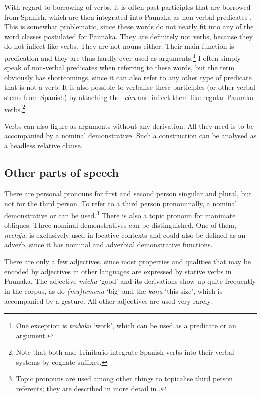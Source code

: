 With regard to borrowing of verbs, it is often past participles that are borrowed from Spanish, which are then integrated into Paunaka as non-verbal predicates \citep[cf.][]{Terhart_subm}. This is somewhat problematic, since these words do not neatly fit into any of the word classes postulated for Paunaka. They are definitely not verbs, because they do not inflect like verbs. They are not nouns either. Their main function is predication and they are thus hardly ever used as arguments.\footnote{One exception is \textit{trabaku} ‘work’, which can be used as a predicate or an argument.} I often simply speak of non-verbal predicates when referring to these words, but the term obviously has shortcomings, since it can also refer to any other type of predicate that is not a verb. It is also possible to verbalise these participles (or other verbal stems from Spanish) by attaching the  \textit{-chu} and inflect them like regular Paunaka verbs.\footnote{Note that both  and Trinitario integrate Spanish verbs into their verbal systems by cognate suffixes.}

Verbs can also figure as arguments without any derivation. All they need is to be accompanied by a nominal demonstrative. Such a construction can be analysed as a headless relative clause.

\subsection{Other parts of speech}\label{sec:POS_Others}

There are personal pronouns for first and second person singular and plural, but not for the third person. To refer to a third person pronominally, a nominal demonstrative or  can be used.\footnote{Topic pronouns are used among other things to topicalise third person referents; they are described in more detail in .} There is also a topic pronoun for inanimate obliques. Three nominal demonstratives can be distinguished. One of them, \textit{nechÿu}, is exclusively used in locative contexts and could also be defined as an adverb, since it has nominal and adverbial demonstrative functions.

There are only a few adjectives, since most properties and qualities that may be encoded by adjectives in other languages are expressed by stative verbs in Paunaka. The adjective \textit{micha} ‘good’ and its derivations show up quite frequently in the corpus, as do \textit{(mu)temena} ‘big’ and the  \textit{kana} ‘this size’, which is accompanied by a gesture. All other adjectives are used very rarely.

